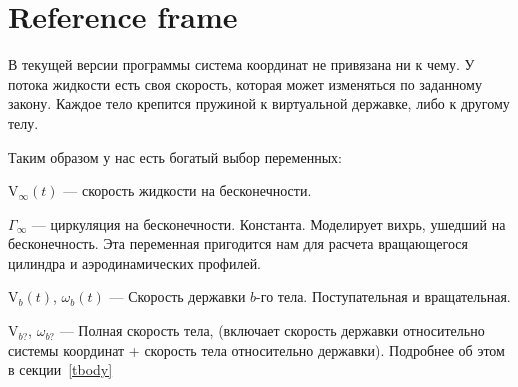 \documentclass[14pt]{extreport}
\newcommand{\comment}[1]{}
\newcommand{\br}[1]{\boldsymbol{\mathrm{#1}}}
\newenvironment{packed_itemize}{
\begin{itemize}
  \setlength{\itemsep}{1pt}
  \setlength{\parskip}{0pt}
  \setlength{\parsep}{0pt}
}{\end{itemize}}
\begin{document}
\section{Reference frame}
\label{refframe}
В текущей версии программы система координат не привязана ни к чему. У потока жидкости есть своя скорость, которая может изменяться по заданному закону. Каждое тело крепится пружиной к виртуальной державке, либо к другому телу.

Таким образом у нас есть богатый выбор переменных:
\begin{packed_itemize}
\item $\br V_\infty(t)$ --- скорость жидкости на бесконечности.
\item $\Gamma_{\infty}$ --- циркуляция на бесконечности. Константа. Моделирует вихрь, ушедший на бесконечность. Эта переменная пригодится нам для расчета вращающегося цилиндра и аэродинамических профилей.
\item $\br V_b(t)$, $\omega_b(t)$ --- Скорость державки $b$-го тела. Поступательная и вращательная.
\item $\br V_{b?}$, $\omega_{b?}$ --- Полная скорость тела, (включает скорость державки относительно системы координат + скорость тела относительно державки). Подробнее об этом в секции~\ref{tbody}
\end{packed_itemize}

\comment{Система координат используется правая. Это значит, если вы рисуете ось $Ox$ слева на право, а ось $Oy$ снизу вверх, то положительным направлением вращения будет являться вращение против часовой стрелки.

Помимо основной системы координат, имеется так же система координат тела: $Ox_b y_b$. С основной системой координат она связана выражением
\begin{equation*}
\br r = \br r_c + \left(\begin{array}{cc}
\cos(\alpha) & -\sin(\alpha) \\
sin(\alpha) & \cos(\alpha) \end{array}\right) \cdot \br r_b
\end{equation*}
Центр поворота жестко связан с центром системы $Ox_b y_b$. Это нужно учитывать при загрузке тела. Система осчета тела используется только при загрузке. Везде внутри комплекса координаты тела записываются в основной системе. 
\begin{center}\end{center}
}
\end{document}
